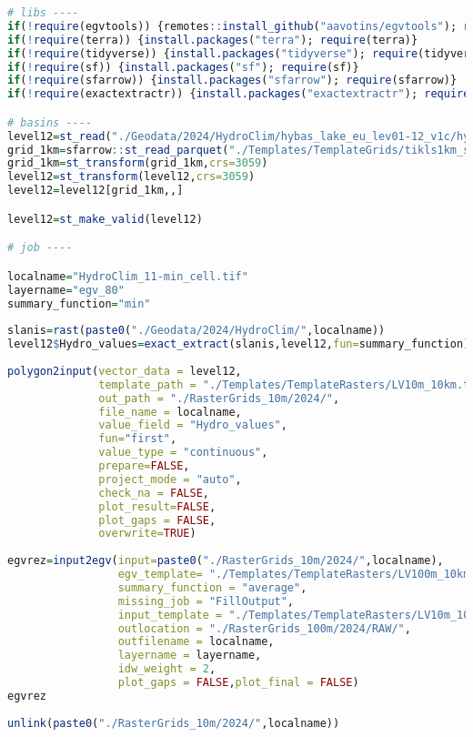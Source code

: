 \documentclass[
]{book}
\begin{document}
\begin{lstlisting}[language=R]
# libs ----
if(!require(egvtools)) {remotes::install_github("aavotins/egvtools"); require(egvtools)}
if(!require(terra)) {install.packages("terra"); require(terra)}
if(!require(tidyverse)) {install.packages("tidyverse"); require(tidyverse)}
if(!require(sf)) {install.packages("sf"); require(sf)}
if(!require(sfarrow)) {install.packages("sfarrow"); require(sfarrow)}
if(!require(exactextractr)) {install.packages("exactextractr"); require(exactextractr)}

# basins ----
level12=st_read("./Geodata/2024/HydroClim/hybas_lake_eu_lev01-12_v1c/hybas_lake_eu_lev12_v1c.shp")
grid_1km=sfarrow::st_read_parquet("./Templates/TemplateGrids/tikls1km_sauzeme.parquet")
grid_1km=st_transform(grid_1km,crs=3059)
level12=st_transform(level12,crs=3059)
level12=level12[grid_1km,,]

level12=st_make_valid(level12)

# job ----

localname="HydroClim_11-min_cell.tif"
layername="egv_80"
summary_function="min"
  
slanis=rast(paste0("./Geodata/2024/HydroClim/",localname))
level12$Hydro_values=exact_extract(slanis,level12,fun=summary_function)
  
polygon2input(vector_data = level12,
              template_path = "./Templates/TemplateRasters/LV10m_10km.tif",
              out_path = "./RasterGrids_10m/2024/",
              file_name = localname,
              value_field = "Hydro_values",
              fun="first",
              value_type = "continuous",
              prepare=FALSE,
              project_mode = "auto",
              check_na = FALSE,
              plot_result=FALSE,
              plot_gaps = FALSE,
              overwrite=TRUE)
  
egvrez=input2egv(input=paste0("./RasterGrids_10m/2024/",localname),
                 egv_template= "./Templates/TemplateRasters/LV100m_10km.tif",
                 summary_function = "average",
                 missing_job = "FillOutput",
                 input_template = "./Templates/TemplateRasters/LV10m_10km.tif",
                 outlocation = "./RasterGrids_100m/2024/RAW/",
                 outfilename = localname,
                 layername = layername,
                 idw_weight = 2,
                 plot_gaps = FALSE,plot_final = FALSE)
egvrez
  
unlink(paste0("./RasterGrids_10m/2024/",localname))
\end{lstlisting}
\end{document}
